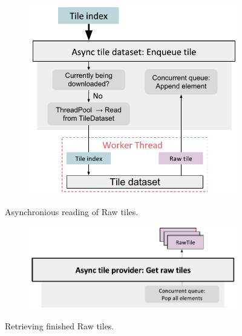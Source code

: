 \begin{figure}[htbp]
    \centering
    \begin{subfigure}[bt]{0.7\textwidth}
        \includegraphics[width=\textwidth]{figures/implementation/pipeline/asynctiledataset.pdf}
    \end{subfigure}
    \caption{Asynchronious reading of Raw tiles.}
    \label{fig:asynctiledataset}
\end{figure}

\begin{figure}[htbp]
    \centering
    \begin{subfigure}[bt]{0.7\textwidth}
        \includegraphics[width=\textwidth]{figures/implementation/pipeline/asynctiledataset2.pdf}
    \end{subfigure}
    \caption{Retrieving finished Raw tiles.}
    \label{fig:asynctiledataset2}
\end{figure}

